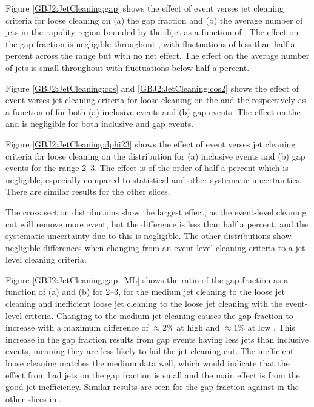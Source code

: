 Figure \ref{GBJ2:JetCleaning:gap} shows the effect of event verses jet cleaning criteria for loose cleaning on (a) the gap fraction and (b) the average number of jets in the rapidity region bounded by the dijet as a function of \dy{}.
The effect on the gap fraction is negligible throughout \dy{}, with fluctuations of less than half a percent across the \dy{} range but with no net effect.
The effect on the average number of jets is small throughout \dy{} with fluctuations below half a percent.

Figure \ref{GBJ2:JetCleaning:cos} and \ref{GBJ2:JetCleaning:cos2} shows the effect of event verses jet cleaning criteria for loose cleaning on the \mean{\cosdphi{}} and the \mean{\costwodphi{}} respectively as a function of \dy{} for both (a) inclusive events and (b) gap events.
The effect on the \mean{\cosdphi{}} and \mean{\costwodphi{}} is negligible for both inclusive and gap events.

Figure \ref{GBJ2:JetCleaning:dphi23} shows the effect of event verses jet cleaning criteria for loose cleaning on the \dphi{} distribution for (a) inclusive events and (b) gap events for the \dy{} range 2--3. 
The effect is of the order of half a percent which is negligible, especially compared to statistical and other systematic uncertainties.
There are similar results for the other \dy{} slices.

The cross section distributions show the largest effect, as the event-level cleaning cut will remove more event, but the difference is less than half a percent, and the systematic uncertainty due to this is negligible.
The other distributions show negligible differences when changing from an event-level cleaning criteria to a jet-level cleaning criteria. 



Figure \ref{GBJ2:JetCleaning:gap_ML} shows the ratio of the gap fraction as a function of (a) \dy{} and (b) \qz{} for \dy{} 2--3,  for the medium jet cleaning to the loose jet cleaning and inefficient loose jet cleaning to the loose jet cleaning with the event-level criteria.
Changing to the medium jet cleaning causes the gap fraction to increase with a maximum difference of $\approx 2\%$ at high \dy{} and $\approx 1\%$ at low \qz{}.
This increase in the gap fraction results from gap events having less jets than inclusive events, meaning they are less likely to fail the jet cleaning cut. 
The inefficient loose cleaning matches the medium data well, which would indicate that the effect from bad jets on the gap fraction is small and the main effect is from the good jet inefficiency. 
Similar results are seen for the gap fraction against \qz{} in the other slices in \dy{}.  

